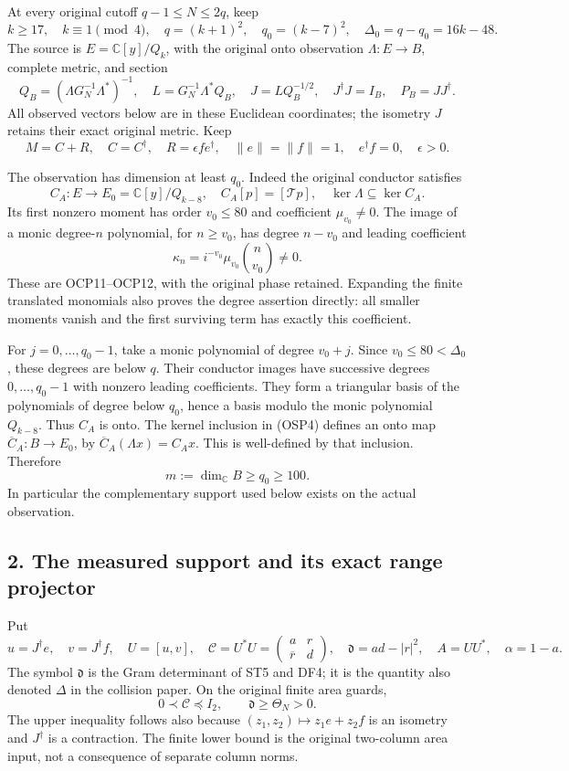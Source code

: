\documentclass[
]{article}
\begin{document}
At every original cutoff \(q-1\le N\le2q\), keep \[
k\ge17,\quad k\equiv1\pmod4,\quad q=(k+1)^2,
\quad q_0=(k-7)^2,\quad \Delta_0=q-q_0=16k-48.
\tag{OSP1}
\] The source is \(E=\mathbb C[y]/Q_k\), with the original onto
observation \(\Lambda:E\to B\), complete metric, and section \[
Q_B=(\Lambda G_N^{-1}\Lambda^*)^{-1},\quad
L=G_N^{-1}\Lambda^*Q_B,\quad J=LQ_B^{-1/2},
\quad J^\dagger J=I_B,\quad P_B=JJ^\dagger.
\tag{OSP2}
\] All observed vectors below are in these Euclidean coordinates; the
isometry \(J\) retains their exact original metric. Keep \[
M=C+R,\quad C=C^\dagger,\quad R=\epsilon fe^\dagger,
\quad\|e\|=\|f\|=1,\quad e^\dagger f=0,\quad\epsilon>0.
\tag{OSP3}
\]

The observation has dimension at least \(q_0\). Indeed the original
conductor satisfies \[
C_A:E\to E_0=\mathbb C[y]/Q_{k-8},\quad
C_A[p]=[\mathcal Tp],\quad\ker\Lambda\subseteq\ker C_A.
\tag{OSP4}
\] Its first nonzero moment has order \(v_0\le80\) and coefficient
\(\mu_{v_0}\ne0\). The image of a monic degree-\(n\) polynomial, for
\(n\ge v_0\), has degree \(n-v_0\) and leading coefficient \[
\kappa_n=i^{-v_0}\mu_{v_0}\binom n{v_0}\ne0.
\tag{OSP5}
\] These are OCP11--OCP12, with the original phase retained. Expanding
the finite translated monomials also proves the degree assertion
directly: all smaller moments vanish and the first surviving term has
exactly this coefficient.

For \(j=0,\ldots,q_0-1\), take a monic polynomial of degree \(v_0+j\).
Since \(v_0\le80<\Delta_0\), these degrees are below \(q\). Their
conductor images have successive degrees \(0,\ldots,q_0-1\) with nonzero
leading coefficients. They form a triangular basis of the polynomials of
degree below \(q_0\), hence a basis modulo the monic polynomial
\(Q_{k-8}\). Thus \(C_A\) is onto. The kernel inclusion in (OSP4)
defines an onto map \(\overline C_A:B\to E_0\), by
\(\overline C_A(\Lambda x)=C_Ax\). This is well-defined by that
inclusion. Therefore \[
m:=\dim_{\mathbb C}B\ge q_0\ge100.
\tag{OSP6}
\] In particular the complementary support used below exists on the
actual observation.

\subsection{2. The measured support and its exact range
projector}\label{the-measured-support-and-its-exact-range-projector}

Put \[
u=J^\dagger e,\quad v=J^\dagger f,\quad U=[u,v],\quad
\mathcal C=U^*U=\begin{pmatrix}a&r\\\overline r&d\end{pmatrix},
\quad\mathfrak d=ad-|r|^2,\quad A=UU^*,\quad\alpha=1-a.
\tag{OSP7}
\] The symbol \(\mathfrak d\) is the Gram determinant of ST5 and DF4; it
is the quantity also denoted \(\Delta\) in the collision paper. On the
original finite area guards, \[
0\prec\mathcal C\preceq I_2,\qquad\mathfrak d\ge\Theta_N>0.
\tag{OSP8}
\] The upper inequality follows also because
\((z_1,z_2)\mapsto z_1e+z_2f\) is an isometry and \(J^\dagger\) is a
contraction. The finite lower bound is the original two-column area
input, not a consequence of separate column norms.
\end{document}
